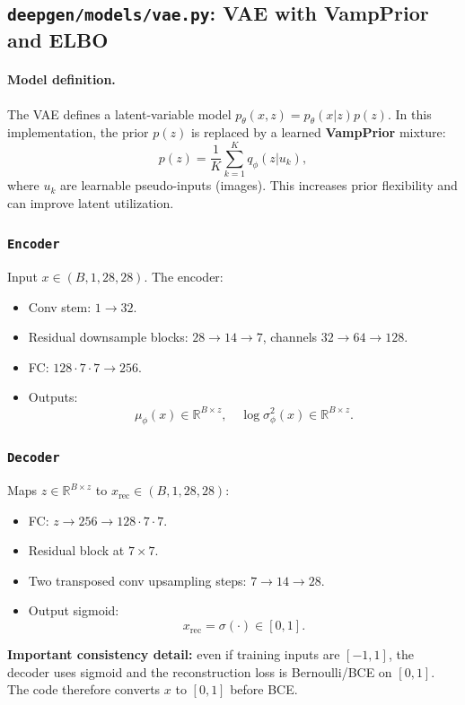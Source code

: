 \subsection{\texttt{deepgen/models/vae.py}: VAE with VampPrior and ELBO}
\label{subsec:code_vae}

\paragraph{Model definition.}
The VAE defines a latent-variable model \(p_\theta(x,z)=p_\theta(x|z)p(z)\). In this implementation, the prior \(p(z)\) is replaced by a learned \textbf{VampPrior} mixture:
\[
p(z)=\frac{1}{K}\sum_{k=1}^K q_\phi(z|u_k),
\]
where \(u_k\) are learnable pseudo-inputs (images). This increases prior flexibility and can improve latent utilization.

\subsubsection*{\texttt{Encoder}}
Input \(x\in(B,1,28,28)\). The encoder:
\begin{itemize}
  \item Conv stem: \(1\rightarrow 32\).
  \item Residual downsample blocks: \(28\rightarrow 14\rightarrow 7\), channels \(32\rightarrow 64\rightarrow 128\).
  \item FC: \(128\cdot 7\cdot 7 \rightarrow 256\).
  \item Outputs:
  \[
  \mu_\phi(x)\in\mathbb{R}^{B\times z}, \quad \log\sigma^2_\phi(x)\in\mathbb{R}^{B\times z}.
  \]
\end{itemize}

\subsubsection*{\texttt{Decoder}}
Maps \(z\in\mathbb{R}^{B\times z}\) to \(x_{\text{rec}}\in(B,1,28,28)\):
\begin{itemize}
  \item FC: \(z\rightarrow 256\rightarrow 128\cdot 7\cdot 7\).
  \item Residual block at \(7\times 7\).
  \item Two transposed conv upsampling steps: \(7\rightarrow 14\rightarrow 28\).
  \item Output sigmoid:
  \[
  x_{\text{rec}}=\sigma(\cdot)\in[0,1].
  \]
\end{itemize}
\textbf{Important consistency detail:} even if training inputs are \([-1,1]\), the decoder uses sigmoid and the reconstruction loss is Bernoulli/BCE on \([0,1]\). The code therefore converts \(x\) to \([0,1]\) before BCE.


